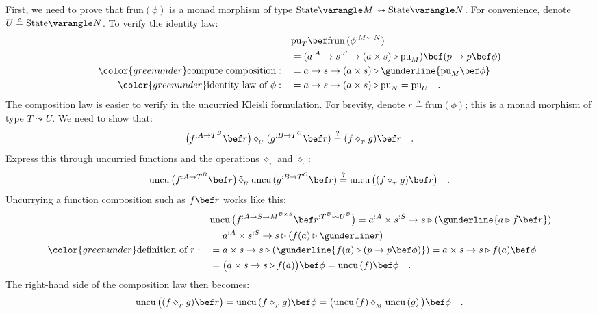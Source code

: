 First, we need to prove that $\text{frun}\left(\phi\right)$ is a
monad morphism of type $\text{State}\varangle M\leadsto\text{State}\varangle N$.
For convenience, denote $U\triangleq\text{State}\varangle N$. To
verify the identity law:
\begin{align*}
 & \text{pu}_{T}\bef\text{frun}\,(\phi^{:M\leadsto N})\\
 & =(a^{:A}\rightarrow s^{:S}\rightarrow(a\times s)\triangleright\text{pu}_{M})\bef(p\rightarrow p\bef\phi)\\
{\color{greenunder}\text{compute composition}:}\quad & =a\rightarrow s\rightarrow(a\times s)\triangleright\gunderline{\text{pu}_{M}\bef\phi}\\
{\color{greenunder}\text{identity law of }\phi:}\quad & =a\rightarrow s\rightarrow(a\times s)\triangleright\text{pu}_{N}=\text{pu}_{U}\quad.
\end{align*}
The composition law is easier to verify in the uncurried Kleisli formulation.
For brevity, denote $r\triangleq\text{frun}\left(\phi\right)$; this
is a monad morphism of type $T\leadsto U$. We need to show that:
\[
\big(f^{:A\rightarrow T^{B}}\bef r\big)\diamond_{_{U}}(g^{:B\rightarrow T^{C}}\bef r)\overset{?}{=}(f\diamond_{_{T}}g)\bef r\quad.
\]
Express this through uncurried functions and the operations $\diamond_{_{T}}$
and $\tilde{\diamond}_{_{U}}$:
\[
\text{uncu}\,\big(f^{:A\rightarrow T^{B}}\bef r\big)\,\tilde{\diamond}_{_{U}}\,\text{uncu}\,(g^{:B\rightarrow T^{C}}\bef r)\overset{?}{=}\text{uncu}\,\big((f\diamond_{_{T}}g)\bef r\big)\quad.
\]
Uncurrying a function composition such as $f\bef r$ works like this:
\begin{align}
 & \text{uncu}\,\big(f^{:A\rightarrow S\rightarrow M^{B\times S}}\bef r^{:T^{B}\leadsto U^{B}}\big)=a^{:A}\times s^{:S}\rightarrow s\triangleright(\gunderline{a\triangleright f\bef r})\nonumber \\
 & =a^{:A}\times s^{:S}\rightarrow s\triangleright(f(a)\triangleright\gunderline r)\nonumber \\
{\color{greenunder}\text{definition of }r:}\quad & =a\times s\rightarrow s\triangleright(\gunderline{f(a)\triangleright(p\rightarrow p\bef\phi)})=a\times s\rightarrow s\triangleright f(a)\bef\phi\nonumber \\
 & =\big(a\times s\rightarrow s\triangleright f(a)\big)\bef\phi=\text{uncu}\,(f)\bef\phi\quad.\label{eq:uncurry-state-composition-derivation1}
\end{align}
The right-hand side of the composition law then becomes:
\[
\text{uncu}\,\big((f\diamond_{_{T}}g)\bef r\big)=\text{uncu}\,(f\diamond_{_{T}}g)\bef\phi=\big(\text{uncu}\left(f\right)\diamond_{_{M}}\text{uncu}\left(g\right)\big)\bef\phi\quad.
\]
